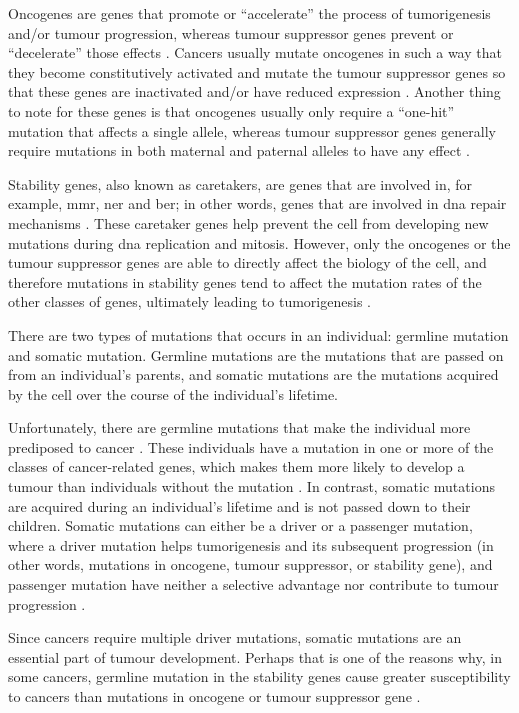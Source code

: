Oncogenes are genes that promote or ``accelerate'' the process of tumorigenesis and/or tumour progression, whereas tumour suppressor genes prevent or ``decelerate'' those effects \citep{Vogelstein2004a}.
Cancers usually mutate oncogenes in such a way that they become constitutively activated and mutate the tumour suppressor genes so that these genes are inactivated and/or have reduced expression \citep{Vogelstein2004a}.
Another thing to note for these genes is that oncogenes usually only require a ``one-hit'' mutation that affects a single allele, whereas tumour suppressor genes generally require mutations in both maternal and paternal alleles to have any effect \citep{Stratton2009,Vogelstein2004a}.

Stability genes, also known as caretakers, are genes that are involved in, for example,  \gls{mmr}, \gls{ner} and \gls{ber}; in other words, genes that are involved in \acrshort{dna} repair mechanisms \citep{Vogelstein2004a}.
These caretaker genes help prevent the cell from developing new mutations during \acrshort{dna} replication and mitosis.
However, only the oncogenes or the tumour suppressor genes are able to directly affect the biology of the cell, and therefore mutations in stability genes tend to affect the mutation rates of the other classes of genes, ultimately leading to tumorigenesis \citep{Vogelstein2004a}.

There are two types of mutations that occurs in an individual: germline mutation and somatic mutation.
Germline mutations are the mutations that are passed on from an individual's parents, and somatic mutations are the mutations acquired by the cell over the course of the individual's lifetime.

Unfortunately, there are germline mutations that make the individual more prediposed to cancer \citep{Vogelstein2004a}.
These individuals have a mutation in one or more of the classes of cancer-related genes, which makes them more likely to develop a tumour than individuals without the mutation \citep{Vogelstein2004a}.
In contrast, somatic mutations are acquired during an individual's lifetime and is not passed down to their children.
Somatic mutations can either be a driver or a passenger mutation, where a driver mutation helps tumorigenesis and its subsequent progression (in other words, mutations in oncogene, tumour suppressor, or stability gene), and passenger mutation have neither a selective advantage nor contribute to tumour progression \citep{Stratton2009}.

Since cancers require multiple driver mutations, somatic mutations are an essential part of tumour development.
Perhaps that is one of the reasons why, in some cancers, germline mutation in the stability genes cause greater susceptibility to cancers than mutations in oncogene or tumour suppressor gene \citep{Vogelstein2004a}.

